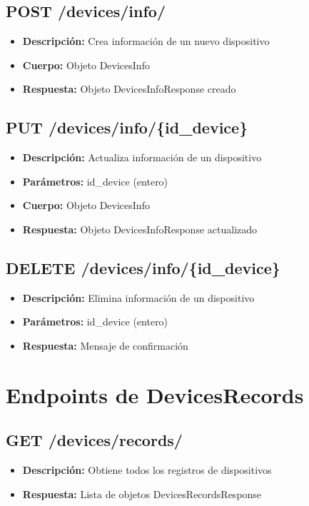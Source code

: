\documentclass[12pt,letterpaper]{report}
\begin{document}
\subsection{POST /devices/info/}
\begin{itemize}
    \item \textbf{Descripción:} Crea información de un nuevo dispositivo
    \item \textbf{Cuerpo:} Objeto DevicesInfo
    \item \textbf{Respuesta:} Objeto DevicesInfoResponse creado
\end{itemize}

\subsection{PUT /devices/info/\{id\_device\}}
\begin{itemize}
    \item \textbf{Descripción:} Actualiza información de un dispositivo
    \item \textbf{Parámetros:} id\_device (entero)
    \item \textbf{Cuerpo:} Objeto DevicesInfo
    \item \textbf{Respuesta:} Objeto DevicesInfoResponse actualizado
\end{itemize}

\subsection{DELETE /devices/info/\{id\_device\}}
\begin{itemize}
    \item \textbf{Descripción:} Elimina información de un dispositivo
    \item \textbf{Parámetros:} id\_device (entero)
    \item \textbf{Respuesta:} Mensaje de confirmación
\end{itemize}

\section{Endpoints de DevicesRecords}
\subsection{GET /devices/records/}
\begin{itemize}
    \item \textbf{Descripción:} Obtiene todos los registros de dispositivos
    \item \textbf{Respuesta:} Lista de objetos DevicesRecordsResponse
\end{itemize}
\end{document}
